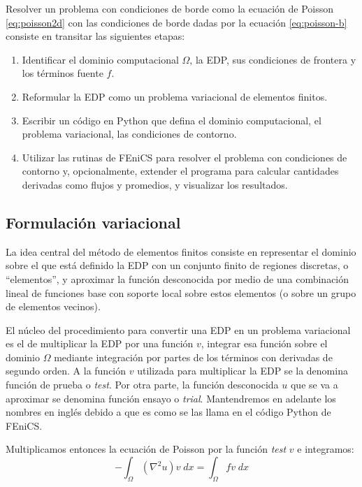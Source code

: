 Resolver un problema con condiciones de borde como la ecuación de Poisson \eqref{eq:poisson2d} con las condiciones de borde dadas por la ecuación \eqref{eq:poisson-b} consiste en transitar las siguientes etapas:
\begin{enumerate}
 \item Identificar el dominio computacional $\Omega$, la EDP, sus condiciones de frontera y los términos fuente $f$.
 \item Reformular la EDP como un problema variacional de elementos finitos.
 \item Escribir un código en Python que defina el dominio computacional, el problema variacional, las condiciones de contorno.
 \item Utilizar las rutinas de FEniCS para resolver el problema con condiciones de contorno y, opcionalmente, extender el programa para calcular cantidades derivadas como flujos y promedios, y visualizar los resultados.
\end{enumerate}

\subsection{Formulación variacional}
La idea central del método de elementos finitos consiste en representar el dominio sobre el que está definido la EDP con un conjunto finito de regiones discretas, o ``elementos'', y aproximar la función desconocida por medio de una combinación lineal de funciones base con soporte local sobre estos elementos (o sobre un grupo de elementos vecinos).

El núcleo del procedimiento para convertir una EDP en un problema variacional es el de multiplicar la EDP por una función $v$, integrar esa función sobre el dominio $\Omega$ mediante integración por partes de los términos con derivadas de segundo orden. A la función $v$ utilizada para multiplicar la EDP se la denomina función de prueba o \textit{test}. Por otra parte, la función desconocida $u$ que se va a aproximar se denomina función ensayo o \textit{trial}. Mantendremos en adelante los nombres en inglés debido a que es como se las llama en el código Python de FEniCS.

Multiplicamos entonces la ecuación de Poisson por la función \textit{test} $v$ e integramos:
\begin{equation}\label{eq:fem01}
 -\int_{\Omega} (\nabla^2 u) v \; dx = \int_{\Omega} f v \; dx
\end{equation} 

